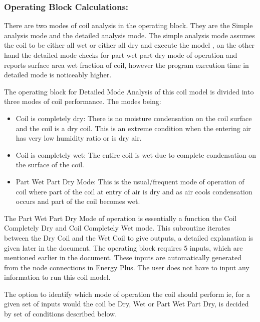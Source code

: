 \subsubsection{Operating Block Calculations:}\label{operating-block-calculations}

There are two modes of coil analysis in the operating block. They are the Simple analysis mode and the detailed analysis mode. The simple analysis mode assumes the coil to be either all wet or either all dry and execute the model , on the other hand the detailed mode checks for part wet part dry mode of operation and reports surface area wet fraction of coil, however the program execution time in detailed mode is noticeably higher.

The operating block for Detailed Mode Analysis of this coil model is divided into three modes of coil performance. The modes being:

\begin{itemize}
  \item
    Coil is completely dry: There is no moisture condensation on the coil surface and the coil is a dry coil. This is an extreme condition when the entering air has very low humidity ratio or is dry air.
  \item
    Coil is completely wet: The entire coil is wet due to complete condensation on the surface of the coil.
  \item
    Part Wet Part Dry Mode: This is the usual/frequent mode of operation of coil where part of the coil at entry of air is dry and as air cools condensation occurs and part of the coil becomes wet.
\end{itemize}

The Part Wet Part Dry Mode of operation is essentially a function the Coil Completely Dry and Coil Completely Wet mode. This subroutine iterates between the Dry Coil and the Wet Coil to give outputs, a detailed explanation is given later in the document. The operating block requires 5 inputs, which are mentioned earlier in the document. These inputs are automatically generated from the node connections in Energy Plus. The user does not have to input any information to run this coil model.

The option to identify which mode of operation the coil should perform ie, for a given set of inputs would the coil be Dry, Wet or Part Wet Part Dry, is decided by set of conditions described below.

